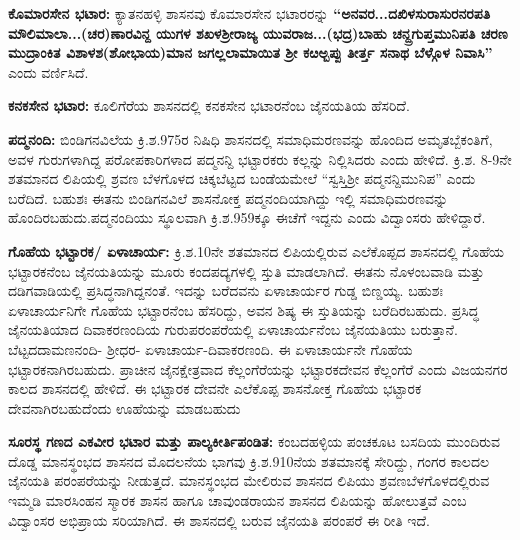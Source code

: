 \textbf{ಕೊಮಾರಸೇನ ಭಟಾರ:} ಕ್ಯಾತನಹಳ್ಳಿ ಶಾಸನವು ಕೊಮಾರಸೇನ ಭಟಾರರನ್ನು \textbf{“ಅನವರ...ದಖಿಳಸುರಾಸುರನರಪತಿ ಮೌಲಿಮಾಲಾ...(ಚರ)ಣಾರವಿನ್ದ ಯುಗಳ ಶಖಳಶ‍್ರೀರಾಜ್ಯ ಯುವರಾಜ...(ಭದ್ರ)ಬಾಹು ಚನ್ದ್ರಗುಪ್ತಮುನಿಪತಿ ಚರಣ ಮುದ್ರಾಂಕಿತ ವಿಶಾಳಶ(ಶೋಭಾಯ)ಮಾನ ಜಗಲ್ಲಲಾಮಾಯಿತ ಶ‍್ರೀ ಕೞಅ್ಬಪ್ಪು ತೀರ್ತ್ತ ಸನಾಥ ಬೆಳ್ಗೊಳ ನಿವಾಸಿ”} ಎಂದು ವರ್ಣಿಸಿದೆ.

\textbf{ಕನಕಸೇನ ಭಟಾರ:} ಕೂಲಿಗೆರೆಯ ಶಾಸನದಲ್ಲಿ ಕನಕಸೇನ ಭಟಾರನೆಂಬ ಜೈನಯತಿಯ ಹೆಸರಿದೆ.

\newpage

\textbf{ಪದ್ಮನಂದಿ:} ಬಿಂಡಿಗನವಿಲೆಯ ಕ್ರಿ.ಶ.975ರ ನಿಷಿಧಿ ಶಾಸನದಲ್ಲಿ ಸಮಾಧಿಮರಣವನ್ನು ಹೊಂದಿದ ಅಮೃತಬ್ಬೆಕಂತಿಗೆ, ಅವಳ ಗುರುಗಳಾಗಿದ್ದ ಪರೋಪಕಾರಿಗಳಾದ ಪದ್ಮನನ್ದಿ ಭಟ್ಟಾರಕರು ಕಲ್ಲನ್ನು ನಿಲ್ಲಿಸಿದರು ಎಂದು ಹೇಳಿದೆ. ಕ್ರಿ.ಶ. 8-9ನೇ ಶತಮಾನದ ಲಿಪಿಯಲ್ಲಿ ಶ್ರವಣ ಬೆಳಗೊಳದ ಚಿಕ್ಕಬೆಟ್ಟದ ಬಂಡೆಯಮೇಲೆ “ಸ್ವಸ್ತಿಶ‍್ರೀ ಪದ್ಮನನ್ದಿಮುನಿಪ” ಎಂದು ಬರೆದಿದೆ. ಬಹುಶಃ ಈತನು ಬಿಂಡಿಗನವಿಲೆ ಶಾಸನೋಕ್ತ ಪದ್ಮನಂದಿಯಾಗಿದ್ದು ಇಲ್ಲಿ ಸಮಾಧಿಮರಣವನ್ನು ಹೊಂದಿರಬಹುದು.\break \hbox{ಪದ್ಮನಂದಿಯು} ಸ್ಥೂಲವಾಗಿ ಕ್ರಿ.ಶ.959ಕ್ಕೂ ಈಚೆಗೆ ಇದ್ದನು ಎಂದು ವಿದ್ವಾಂಸರು ಹೇಳಿದ್ದಾರೆ.

\textbf{ಗೊಹೆಯ ಭಟ್ಟಾರಕ/ ಏಳಾಚಾರ್ಯ:} ಕ್ರಿ.ಶ.10ನೇ ಶತಮಾನದ ಲಿಪಿಯಲ್ಲಿರುವ ಎಲೆಕೊಪ್ಪದ ಶಾಸನದಲ್ಲಿ ಗೊಹೆಯ ಭಟ್ಟಾರಕನೆಂಬ ಜೈನಯತಿಯನ್ನು ಮೂರು ಕಂದಪದ್ಯಗಳಲ್ಲಿ ಸ್ತುತಿ ಮಾಡಲಾಗಿದೆ. ಈತನು ನೊಳಂಬವಾಡಿ ಮತ್ತು ದಡಿಗವಾಡಿಯಲ್ಲಿ ಪ್ರಸಿದ್ಧನಾಗಿದ್ದನಂತೆ. ಇದನ್ನು ಬರೆದವನು ಏಳಾಚಾರ್ಯರ ಗುಡ್ಡ ಬಿಣ್ಡಯ್ಯ. ಬಹುಶಃ ಏಳಾಚಾರ್ಯನಿಗೇ ಗೊಹೆಯ ಭಟ್ಟಾರನೆಂಬ ಹೆಸರಿದ್ದು, ಅವನ ಶಿಷ್ಯ ಈ ಸ್ತುತಿಯನ್ನು ಬರೆದಿರಬಹುದು. ಪ್ರಸಿದ್ಧ ಜೈನ\-ಯತಿಯಾದ ದಿವಾಕರಣಂದಿಯ ಗುರುಪರಂಪರೆಯಲ್ಲಿ ಏಳಾಚಾರ್ಯನೆಂಬ ಜೈನಯತಿಯು ಬರುತ್ತಾನೆ. ಬೆಟ್ಟದ\break ದಾಮಣನಂದಿ- ಶ‍್ರೀಧರ- ಏಳಾಚಾರ್ಯ-ದಿವಾಕರಣಂದಿ. ಈ ಏಳಾಚಾರ್ಯನೇ ಗೊಹೆಯ ಭಟ್ಟಾರಕನಾಗಿರಬಹುದು. ಪ್ರಾಚೀನ ಜೈನಕ್ಷೇತ್ರವಾದ ಕೆಲ್ಲಂಗೆರೆಯನ್ನು ಭಟ್ಟಾರಕದೇವನ ಕೆಲ್ಲಂಗೆರೆ ಎಂದು ವಿಜಯನಗರ ಕಾಲದ ಶಾಸನದಲ್ಲಿ ಹೇಳಿದೆ. ಈ ಭಟ್ಟಾರಕ ದೇವನೇ ಎಲೆಕೊಪ್ಪ ಶಾಸನೋಕ್ತ ಗೊಹೆಯ ಭಟ್ಟಾರಕ ದೇವನಾಗಿರಬಹುದೆಂದು ಊಹೆಯನ್ನು ಮಾಡಬಹುದು

\textbf{ಸೂರಸ್ಥ ಗಣದ ಎಕವೀರ ಭಟಾರ ಮತ್ತು ಪಾಲ್ಯಕೀರ್ತಿಪಂಡಿತ: } ಕಂಬದಹಳ್ಳಿಯ ಪಂಚಕೂಟ ಬಸದಿಯ ಮುಂದಿರುವ ದೊಡ್ಡ ಮಾನಸ್ಥಂಭದ ಶಾಸನದ ಮೊದಲನೆಯ ಭಾಗವು ಕ್ರಿ.ಶ.9\enginline{-}10ನೆಯ ಶತಮಾನಕ್ಕೆ ಸೇರಿದ್ದು, ಗಂಗರ ಕಾಲದಲ ಜೈನಯತಿ ಪರಂಪರೆಯನ್ನು ನೀಡುತ್ತದೆ. ಮಾನಸ್ಥಂಭದ ಮೇಲಿರುವ ಶಾಸನದ ಲಿಪಿಯು ಶ್ರವಣಬೆಳಗೊಳ\-ದಲ್ಲಿರುವ ಇಮ್ಮಡಿ ಮಾರಸಿಂಹನ ಸ್ಮಾರಕ ಶಾಸನ ಹಾಗೂ ಚಾವುಂಡರಾಯನ ಶಾಸನದ ಲಿಪಿಯನ್ನು ಹೋಲುತ್ತವೆ ಎಂಬ ವಿದ್ವಾಂಸರ ಅಭಿಪ್ರಾಯ ಸರಿಯಾಗಿದೆ. ಈ ಶಾಸನದಲ್ಲಿ ಬರುವ ಜೈನಯತಿ ಪರಂಪರೆ ಈ ರೀತಿ ಇದೆ.

